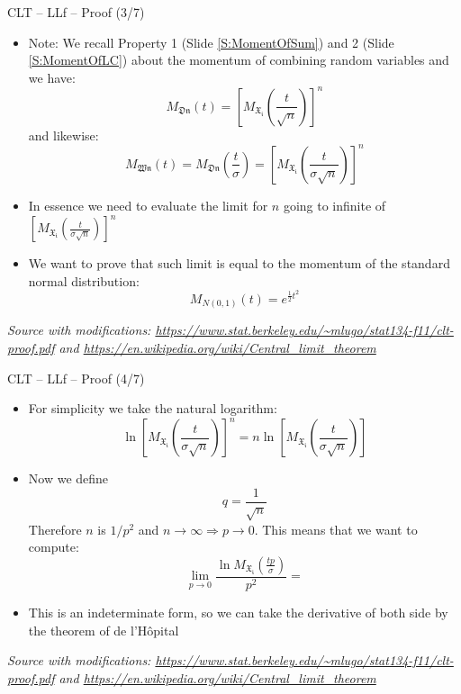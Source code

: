 \documentclass{beamer}
\begin{document}
\begin{frame}
{\centerline{CLT -- LLf -- Proof (3/7)}}


\begin{itemize}
\item Note: We recall Property 1 (Slide \ref{S:MomentOfSum}) and 2 (Slide \ref{S:MomentOfLC}) about the momentum of combining random variables and we have:
$$M_\mathfrak{Dn}(t) = \left [ M_\mathfrak{X_i}(\frac{t}{\sqrt{n}}) \right ] ^ n$$
and likewise:
$$M_\mathfrak{Wn}(t)  = M_\mathfrak{Dn} \left (\frac{t}{\sigma} \right ) = \left [ M_\mathfrak{X_i} \left (\frac{t}{\sigma\sqrt{n}} \right ) \right ] ^ n $$


\item In essence we need to evaluate the limit for $n$ going to infinite of $\left [ M_\mathfrak{X_i} \left (\frac{t}{\sigma\sqrt{n}} \right ) \right ] ^ n $
\item We want to prove that such limit is equal to the momentum of the standard normal distribution:
$$M_{N(0,1)}(t) = e^{\frac{1}{2}t^2} $$
\end{itemize}

\textit{\tiny
\vspace{-\baselineskip}
Source with modifications: \url{https://www.stat.berkeley.edu/~mlugo/stat134-f11/clt-proof.pdf} and \url{https://en.wikipedia.org/wiki/Central_limit_theorem}}
\end{frame}

\begin{frame}
{\centerline{CLT -- LLf -- Proof (4/7)}}

\begin{itemize}
\item For simplicity we take the natural logarithm:
$$ \ln \left [ M_\mathfrak{X_i} \left (\frac{t}{\sigma\sqrt{n}} \right ) \right ] ^ n = n \ln \left [ M_\mathfrak{X_i} \left (\frac{t}{\sigma\sqrt{n}} \right ) \right ]  $$
\item Now we define
$$q = \frac{1}{\sqrt{n}}$$
Therefore $n$ is $1/p^2$ and $n \rightarrow \infty \Rightarrow p \rightarrow 0$. This means that we want to compute:
$$\lim_{p \to 0} \frac{\ln M_\mathfrak{X_i}(\frac{tp}{\sigma})}{p^2} = $$
\item This is an indeterminate form, so we can take the derivative of both side by the theorem of de l'H\^{o}pital

\end{itemize}

\textit{\tiny
\vspace{-\baselineskip}
Source with modifications: \url{https://www.stat.berkeley.edu/~mlugo/stat134-f11/clt-proof.pdf} and \url{https://en.wikipedia.org/wiki/Central_limit_theorem}}
\end{frame}
\end{document}
